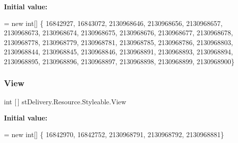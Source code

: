 {\bfseries Initial value\+:}
\begin{DoxyCode}
= \textcolor{keyword}{new} \textcolor{keywordtype}{int}[] \{
                    16842927,
                    16843072,
                    2130968646,
                    2130968656,
                    2130968657,
                    2130968673,
                    2130968674,
                    2130968675,
                    2130968676,
                    2130968677,
                    2130968678,
                    2130968778,
                    2130968779,
                    2130968781,
                    2130968785,
                    2130968786,
                    2130968803,
                    2130968844,
                    2130968845,
                    2130968846,
                    2130968891,
                    2130968893,
                    2130968894,
                    2130968895,
                    2130968896,
                    2130968897,
                    2130968898,
                    2130968899,
                    2130968900\}
\end{DoxyCode}
\mbox{\label{classst_delivery_1_1_resource_1_1_styleable_a0676f4352ec78cc7a618ae3e828a5aa8}} 
\subsubsection{\texorpdfstring{View}{View}}
{\footnotesize\ttfamily int \mbox{[}$\,$\mbox{]} st\+Delivery.\+Resource.\+Styleable.\+View\hspace{0.3cm}{\ttfamily [static]}}

{\bfseries Initial value\+:}
\begin{DoxyCode}
= \textcolor{keyword}{new} \textcolor{keywordtype}{int}[] \{
                    16842970,
                    16842752,
                    2130968791,
                    2130968792,
                    2130968881\}
\end{DoxyCode}
\mbox{\label{classst_delivery_1_1_resource_1_1_styleable_ab355a2b379ea6bd649bdf97a5890d44a}} 
